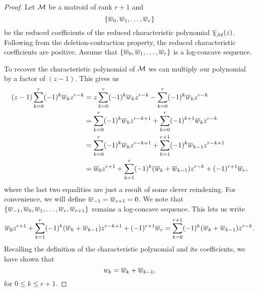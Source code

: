 \documentclass[12pt,oneside]{../../sfsuthesis}
\begin{document}
\begin{proof}

    Let \( \mathcal{M} \) be a matroid of rank \( r + 1 \) and
    \[
        \{\overline{w}_0, \overline{w}_1, \dots, \overline{w}_r \}
    \]
    be the reduced coefficients of the reduced characteristic polynomial \( \overline{\chi}_{\mathcal{M}}(z) \).
    Following from the deletion-contraction property, the reduced characteristic coefficients are positive.
    Assume that \( \{\overline{w}_0, \overline{w}_1, \dots, \overline{w}_r \} \) is a log-concave sequence.

    To recover the characteristic polynomial of \( \mathcal{M} \) we can multiply our polynomial by a factor of \( (z-1) \).
    This gives us
    \begin{align*}
        (z - 1)\sum_{k=0}^r(-1)^k \overline{w}_k z^{r-k} & = z\sum_{k=0}^r(-1)^k \overline{w}_k z^{r-k} - \sum_{k=0}^r(-1)^k \overline{w}_k z^{r-k}              \\
                                                & = \sum_{k=0}^r(-1)^k \overline{w}_k z^{r-k+1} + \sum_{k=0}^r(-1)^{k+1} \overline{w}_k z^{r-k}         \\
                                                & = \sum_{k=0}^r(-1)^k \overline{w}_k z^{r-k+1} + \sum_{k=1}^{r+1}(-1)^{k} \overline{w}_{k-1} z^{r-k+1} \\
                                                & = \overline{w}_0 z^{r+1} + \sum_{k=1}^r (-1)^k (\overline{w}_k + \overline{w}_{k-1})z^{r-k} + (-1)^{r+1}\overline{w}_r,
    \end{align*}
    where the last two equalities are just a result of some clever reindexing.
    For convenience, we will define \( \overline{w}_{-1} = \overline{w}_{r+1} = 0 \).
    We note that \( \{ \overline{w}_{-1}, \overline{w}_0, \overline{w}_1, \dots, \overline{w}_r, \overline{w}_{r+1} \} \) remains a log-concave sequence.
    This lets us write
    \[
        \overline{w}_0 z^{r+1} + \sum_{k=1}^r (-1)^k (\overline{w}_k + \overline{w}_{k-1})z^{r-k+1} + (-1)^{r+1}\overline{w}_r = \sum_{k=0}^{r+1}(-1)^k(\overline{w}_k + \overline{w}_{k-1})z^{r-k}.
    \]
    Recalling the definition of the characteristic polynomial and its coefficients, we have shown that
    \[
        w_k = \overline{w}_k + \overline{w}_{k-1},
    \]
    for \( 0 \leq k \leq r+1 \).


\end{proof}
\end{document}
